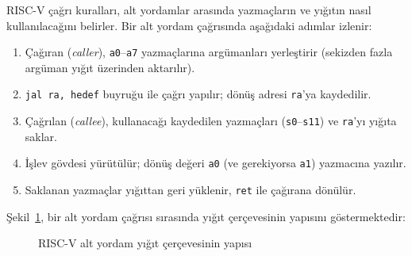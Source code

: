 RISC-V çağrı kuralları, alt yordamlar arasında yazmaçların ve yığıtın nasıl kullanılacağını belirler. Bir alt yordam çağrısında aşağıdaki adımlar izlenir:

\begin{enumerate}
    \item Çağıran (\emph{caller}), \texttt{a0}--\texttt{a7} yazmaçlarına argümanları yerleştirir (sekizden fazla argüman yığıt üzerinden aktarılır).
    \item \texttt{jal ra, hedef} buyruğu ile çağrı yapılır; dönüş adresi \texttt{ra}'ya kaydedilir.
    \item Çağrılan (\emph{callee}), kullanacağı kaydedilen yazmaçları (\texttt{s0}--\texttt{s11}) ve \texttt{ra}'yı yığıta saklar.
    \item İşlev gövdesi yürütülür; dönüş değeri \texttt{a0} (ve gerekiyorsa \texttt{a1}) yazmacına yazılır.
    \item Saklanan yazmaçlar yığıttan geri yüklenir, \texttt{ret} ile çağırana dönülür.
\end{enumerate}

Şekil~\ref{fig:ekc-yigit-cerceve}, bir alt yordam çağrısı sırasında yığıt çerçevesinin yapısını göstermektedir:

\begin{figure}[H]
\centering
{}
\caption{RISC-V alt yordam yığıt çerçevesinin yapısı}
\label{fig:ekc-yigit-cerceve}
\end{figure}

